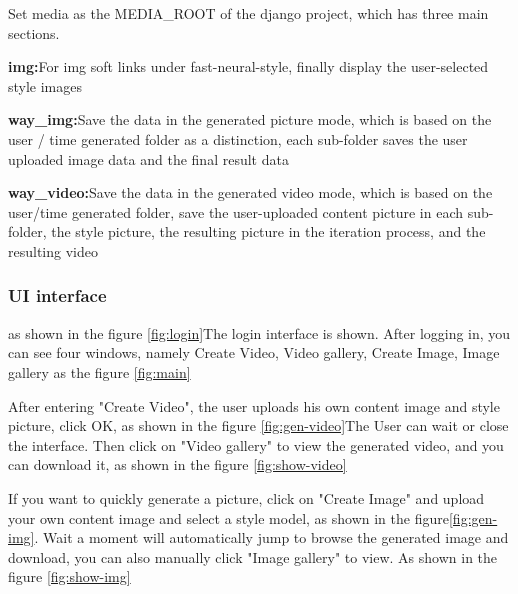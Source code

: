 Set media as the MEDIA\_ROOT of the django project, which has three main sections.
\begin{description}
  \item{\textbf{img:}}For img soft links under fast-neural-style, finally display the user-selected style images
  \item{\textbf{way\_img:}}Save the data in the generated picture mode, which is based on the user / time generated folder as a distinction, each sub-folder saves the user uploaded image data and the final result data
  \item{\textbf{way\_video:}}Save the data in the generated video mode, which is based on the user/time generated folder, save the user-uploaded content picture in each sub-folder, the style picture, the resulting picture in the iteration process, and the resulting video
\end{description}

\subsubsection{UI interface}\label{sec:ui}
as shown in the figure \ref{fig:login}The login interface is shown. After logging in, you can see four windows, namely Create Video, Video gallery, Create Image, Image gallery as the figure \ref{fig:main}

After entering "Create Video", the user uploads his own content image and style picture, click OK, as shown in the figure \ref{fig:gen-video}The User can wait or close the interface.
Then click on "Video gallery" to view the generated video, and you can download it, as shown in the figure \ref{fig:show-video}

If you want to quickly generate a picture, click on "Create Image" and upload your own content image and select a style model, as shown in the figure\ref{fig:gen-img}.
Wait a moment will automatically jump to browse the generated image and download, you can also manually click "Image gallery" to view. As shown in the figure \ref{fig:show-img}
